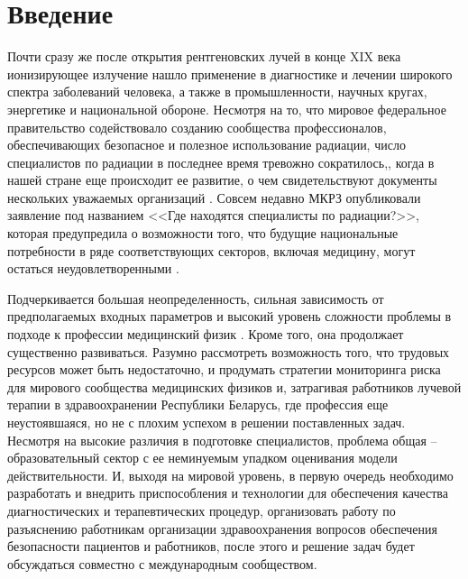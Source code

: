 
\section{Введение}{\parindent 1.27cm}

Почти сразу же после открытия рентгеновских лучей в конце XIX века \cite{W. C. Röntgen} ионизирующее излучение нашло применение в диагностике и лечении широкого спектра заболеваний человека, а также в промышленности, научных кругах, энергетике и национальной обороне. Несмотря на то, что мировое федеральное правительство содействовало созданию сообщества профессионалов, обеспечивающих безопасное и полезное использование радиации, число специалистов по радиации в последнее время тревожно сократилось,, когда в нашей стране еще происходит ее развитие, о чем свидетельствуют документы нескольких уважаемых организаций \cite{USGAO 2014}\cite{HPS 2013}\cite{NCRP 2015}. Совсем недавно МКРЗ опубликовали заявление под названием <<Где находятся специалисты по радиации?>>, которая предупредила о возможности того, что будущие национальные потребности в ряде соответствующих секторов, включая медицину, могут остаться неудовлетворенными \cite{NCRP 2015}.

Подчеркивается большая неопределенность, сильная зависимость от предполагаемых входных параметров и высокий уровень сложности проблемы в подходе к профессии медицинский физик \cite{Mills MD.2014}. Кроме того, она продолжает существенно развиваться. Разумно рассмотреть возможность того, что трудовых ресурсов может быть недостаточно, и продумать стратегии мониторинга риска для мирового сообщества медицинских физиков и, затрагивая работников лучевой терапии в здравоохранении Республики Беларусь, где профессия еще неустоявшаяся, но не с плохим успехом в решении поставленных задач. Несмотря на высокие различия в подготовке специалистов, проблема общая -- образовательный сектор с ее неминуемым упадком оценивания модели действительности. И, выходя на мировой уровень, в первую очередь необходимо разработать и внедрить приспособления и технологии для обеспечения качества диагностических и терапевтических процедур, организовать работу по разъяснению работникам организации здравоохранения вопросов обеспечения безопасности пациентов и работников, после этого и решение задач будет обсуждаться совместно с международным сообществом.

